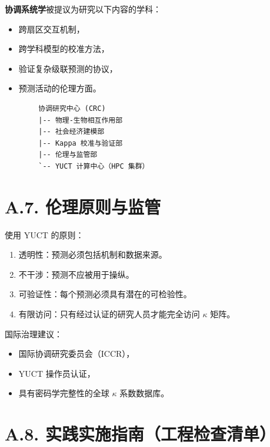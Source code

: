 \documentclass[11pt,a4paper]{article}
\begin{document}
	\textbf{协调系统学}被提议为研究以下内容的学科：
	\begin{itemize}[leftmargin=*]
		\item 跨扇区交互机制，
		\item 跨学科模型的校准方法，
		\item 验证复杂级联预测的协议，
		\item 预测活动的伦理方面。
	\end{itemize}
	
	\begin{lstlisting}
		协调研究中心 (CRC)
		|-- 物理-生物相互作用部
		|-- 社会经济建模部
		|-- Kappa 校准与验证部
		|-- 伦理与监管部
		`-- YUCT 计算中心（HPC 集群）
	\end{lstlisting}
	
	\section*{A.7. 伦理原则与监管}
	
	使用 YUCT 的原则：
	\begin{enumerate}[leftmargin=*]
		\item 透明性：预测必须包括机制和数据来源。
		\item 不干涉：预测不应被用于操纵。
		\item 可验证性：每个预测必须具有潜在的可检验性。
		\item 有限访问：只有经过认证的研究人员才能完全访问 $\kappa$ 矩阵。
	\end{enumerate}
	
	国际治理建议：
	\begin{itemize}[leftmargin=*]
		\item 国际协调研究委员会（ICCR），
		\item YUCT 操作员认证，
		\item 具有密码学完整性的全球 $\kappa$ 系数数据库。
	\end{itemize}
	
	\section*{A.8. 实践实施指南（工程检查清单）}
	
\end{document}
